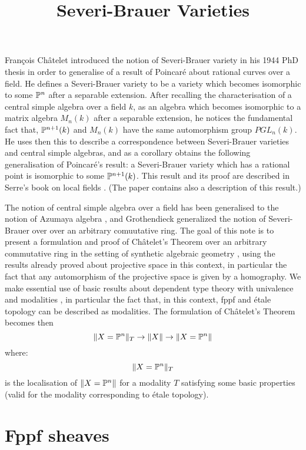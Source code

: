 \documentclass{../util/zariski}
\title{Severi-Brauer Varieties}
\begin{document}
\maketitle

{F}ran\c cois {C}h\^atelet introduced the notion of Severi-Brauer variety in his 1944 PhD thesis
\cite{chatelet44} in order to generalise of a result of Poincar\'e about rational curves over a field.
He defines a Severi-Brauer variety to be a variety which becomes isomorphic to some $\mathbb{P}^n$ after
a separable extension. After recalling the characterisation of a central simple algebra over a field $k$, as
an algebra which becomes isomorphic to a matrix algebra $M_n(k)$ after a separable extension, he notices the fundamental
fact that, $\mathbb{P}^{n+1}(k)$ and $M_n(k)$ have the same automorphism group $PGL_{n}(k)$. He uses then this
to describe a correspondence between Severi-Brauer varieties and central simple algebras, and as a corollary
obtains the following generalisation of Poincar\'e's result: a Severi-Brauer variety which has a rational point
is isomorphic to some $\mathbb{P}^{n+1}(k)$. This result and its proof are described in Serre's book on local fields \cite{serre62}.
(The paper \cite{colliot88} contains also a description of this result.)

The notion of central simple algebra over a field
has been generalised to the notion of Azumaya algebra  \cite{azumaya51}, and
Grothendieck \cite{grothendieck68} generalized the notion of Severi-Brauer over over an arbitrary comuutative ring.
The goal of this note is to present a formulation and proof of Ch\^atelet's Theorem over an arbitrary commutative ring
in the setting of synthetic algebraic geometry \cite{draft}, using the results already proved about projective
space \cite{sag-projective} in this context, in particular the fact that any automorphism of the projective space is given
by a homography. We make essential use of basic results about dependent type theory with univalence \cite{hott}
and modalities \cite{modalities}, in particular the fact that, in this context, fppf and \'etale topology can be described
as modalities. The formulation of Ch\^atelet's Theorem becomes then
\[\lVert X=\mathbb{P}^n \rVert_{T} \to \lVert X \rVert \to \lVert X=\mathbb{P}^n \rVert\]
where:
\[\lVert X=\mathbb{P}^n \rVert_{T}\]
is the localisation of $\lVert X=\mathbb{P}^n \rVert$ for a modality $T$ satisfying some basic properties (valid for the modality
corresponding to \'etale topology).

\tableofcontents

\section{Fppf sheaves}

\end{document}
